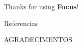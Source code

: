 \documentclass{beamer}
\begin{document}
\begin{frame}[focus]
	Thanks for using \textbf{Focus}!
\end{frame}
\fi


\appendix

\begin{frame}{Referencias}

	
	
\end{frame}


\begin{frame}[focus]
AGRADECIMENTOS
\vfill

\end{frame}

\end{document}
